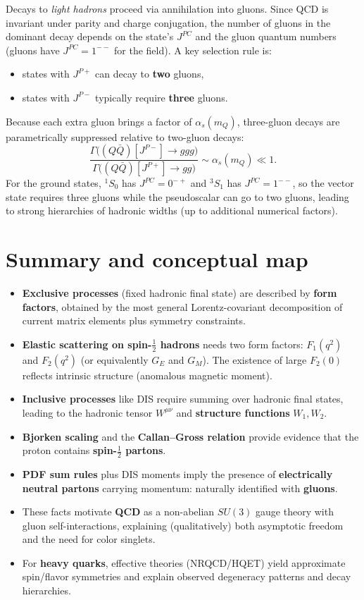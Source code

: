 Decays to \emph{light hadrons} proceed via annihilation into gluons. Since QCD is invariant under
parity and charge conjugation, the number of gluons in the dominant decay depends on the state's
$J^{PC}$ and the gluon quantum numbers (gluons have $J^{PC}=1^{--}$ for the field).
A key selection rule is:
\begin{itemize}
  \item states with $J^{P+}$ can decay to \textbf{two} gluons,
  \item states with $J^{P-}$ typically require \textbf{three} gluons.
\end{itemize}
Because each extra gluon brings a factor of $\alpha_s(m_Q)$, three-gluon decays are parametrically
suppressed relative to two-gluon decays:
\begin{equation}
\frac{\Gamma\bigl((Q\bar Q)[J^{P-}]\to ggg\bigr)}
{\Gamma\bigl((Q\bar Q)[J^{P+}]\to gg\bigr)}
\sim \alpha_s(m_Q)\ll 1.
\end{equation}
For the ground states, $^1S_0$ has $J^{PC}=0^{-+}$ and $^3S_1$ has $J^{PC}=1^{--}$, so the
vector state requires three gluons while the pseudoscalar can go to two gluons, leading to strong
hierarchies of hadronic widths (up to additional numerical factors).

\section{Summary and conceptual map}
\begin{itemize}
  \item \textbf{Exclusive processes} (fixed hadronic final state) are described by \textbf{form factors},
  obtained by the most general Lorentz-covariant decomposition of current matrix elements
  plus symmetry constraints.
  \item \textbf{Elastic scattering on spin-$\tfrac12$ hadrons} needs two form factors:
  $F_1(q^2)$ and $F_2(q^2)$ (or equivalently $G_E$ and $G_M$).
  The existence of large $F_2(0)$ reflects intrinsic structure (anomalous magnetic moment).
  \item \textbf{Inclusive processes} like DIS require summing over hadronic final states, leading to
  the hadronic tensor $W^{\mu\nu}$ and \textbf{structure functions} $W_1,W_2$.
  \item \textbf{Bjorken scaling} and the \textbf{Callan--Gross relation} provide evidence that the proton
  contains \textbf{spin-$\tfrac12$ partons}.
  \item \textbf{PDF sum rules} plus DIS moments imply the presence of \textbf{electrically neutral partons}
  carrying momentum: naturally identified with \textbf{gluons}.
  \item These facts motivate \textbf{QCD} as a non-abelian $SU(3)$ gauge theory with gluon self-interactions,
  explaining (qualitatively) both asymptotic freedom and the need for color singlets.
  \item For \textbf{heavy quarks}, effective theories (NRQCD/HQET) yield approximate spin/flavor symmetries
  and explain observed degeneracy patterns and decay hierarchies.
\end{itemize}
